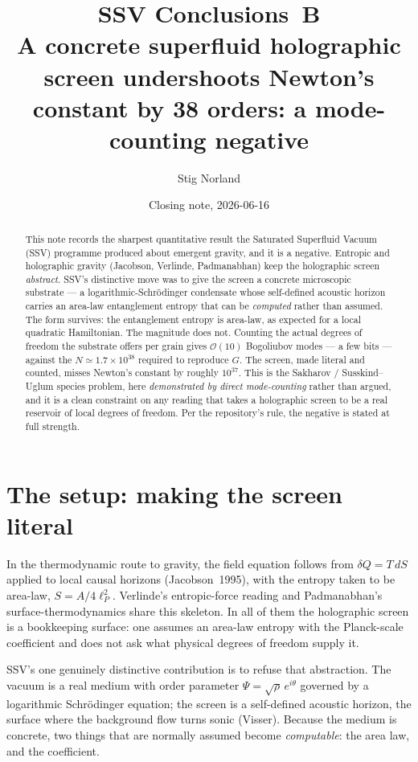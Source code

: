 \documentclass[11pt]{article}
\title{SSV Conclusions~B\\[2pt]
\large A concrete superfluid holographic screen undershoots Newton's\\
constant by 38 orders: a mode-counting negative}
\author{Stig Norland}
\date{Closing note, 2026-06-16}
\begin{document}
\maketitle

\begin{abstract}
This note records the sharpest quantitative result the Saturated Superfluid
Vacuum (SSV) programme produced about emergent gravity, and it is a negative.
Entropic and holographic gravity (Jacobson, Verlinde, Padmanabhan) keep the
holographic screen \emph{abstract}. SSV's distinctive move was to give the screen
a concrete microscopic substrate --- a logarithmic-Schr\"odinger condensate whose
self-defined acoustic horizon carries an area-law entanglement entropy that can be
\emph{computed} rather than assumed. The form survives: the entanglement entropy
is area-law, as expected for a local quadratic Hamiltonian. The magnitude does
not. Counting the actual degrees of freedom the substrate offers per grain gives
$\mathcal{O}(10)$ Bogoliubov modes --- a few bits --- against the
$N \simeq 1.7\times10^{38}$ required to reproduce $G$. The screen, made literal
and counted, misses Newton's constant by roughly $10^{37}$. This is the
Sakharov / Susskind--Uglum species problem, here \emph{demonstrated by direct
mode-counting} rather than argued, and it is a clean constraint on any reading
that takes a holographic screen to be a real reservoir of local degrees of
freedom. Per the repository's rule, the negative is stated at full strength.
\end{abstract}

\section{The setup: making the screen literal}

In the thermodynamic route to gravity, the field equation follows from
$\delta Q = T\,dS$ applied to local causal horizons (Jacobson~1995), with the
entropy taken to be area-law, $S = A/4\ell_P^2$. Verlinde's entropic-force reading
and Padmanabhan's surface-thermodynamics share this skeleton. In all of them the
holographic screen is a bookkeeping surface: one assumes an area-law entropy with
the Planck-scale coefficient and does not ask what physical degrees of freedom
supply it.

SSV's one genuinely distinctive contribution is to refuse that abstraction. The
vacuum is a real medium with order parameter $\Psi=\sqrt{\rho}\,e^{i\theta}$
governed by a logarithmic Schr\"odinger equation; the screen is a self-defined
acoustic horizon, the surface where the background flow turns sonic (Visser).
Because the medium is concrete, two things that are normally assumed become
\emph{computable}: the area law, and the coefficient.
\end{document}
